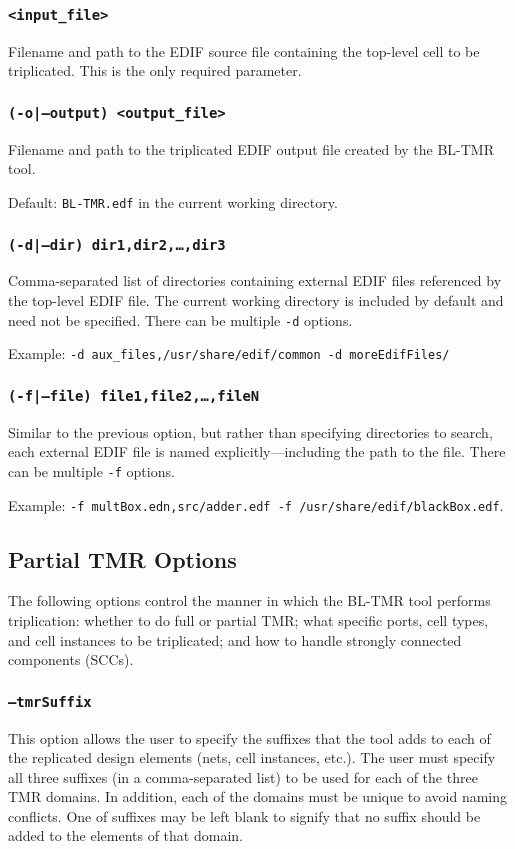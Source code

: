 \documentclass[english]{article}
\begin{document}
\subsubsection{\texttt{<input\_file>}}
Filename and path to the EDIF source file containing the top-level cell to be 
triplicated. This is the only required parameter.

\subsubsection{\texttt{(-o|--output) <output\_file>}}
Filename and path to the triplicated EDIF output file created by the BL-TMR
tool. 

Default: \texttt{BL-TMR.edf} in the current working directory.

\subsubsection{\texttt{(-d|--dir) dir1,dir2,\ldots,dir3}}
Comma-separated list of directories containing external EDIF files referenced 
by the top-level EDIF file. The current working directory is included by 
default and need not be specified. There can be multiple \texttt{-d} options.

Example: \texttt{-d aux\_files,/usr/share/edif/common -d moreEdifFiles/}

\subsubsection{\texttt{(-f|--file) file1,file2,\ldots,fileN}}
Similar to the previous option, but rather than specifying directories to 
search, each external EDIF file is named explicitly---including the path to the 
file. There can be multiple \texttt{-f} options. 

Example: \texttt{-f multBox.edn,src/adder.edf -f /usr/share/edif/blackBox.edf}.

\subsection{Partial TMR Options}
The following options control the manner in which the BL-TMR tool performs
triplication: whether to do full or partial TMR; what specific ports, cell
types, and cell instances to be triplicated; and how to handle strongly
connected components (SCCs).

\subsubsection{\texttt{--tmrSuffix}}
This option allows the user to specify the suffixes that the tool adds to each
of the replicated design elements (nets, cell instances, etc.). The user must
specify all three suffixes (in a comma-separated list) to be used for each of
the three TMR domains. In addition, each of the domains must be unique to avoid
naming conflicts. One of suffixes may be left blank to signify that no suffix
should be added to the elements of that domain.
\end{document}
